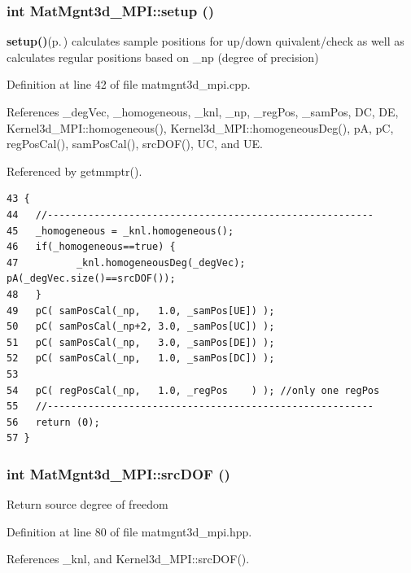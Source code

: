 \subsubsection{\setlength{\rightskip}{0pt plus 5cm}int Mat\-Mgnt3d\_\-MPI::setup ()}\label{classMatMgnt3d__MPI_415266b005d267e801176f27c0434a50_415266b005d267e801176f27c0434a50}


{\bf setup()}{\rm (p.\,\pageref{classMatMgnt3d__MPI_415266b005d267e801176f27c0434a50_415266b005d267e801176f27c0434a50})} calculates sample positions for up/down quivalent/check as well as calculates regular positions based on \_\-np (degree of precision) 

Definition at line 42 of file matmgnt3d\_\-mpi.cpp.

References \_\-deg\-Vec, \_\-homogeneous, \_\-knl, \_\-np, \_\-reg\-Pos, \_\-sam\-Pos, DC, DE, Kernel3d\_\-MPI::homogeneous(), Kernel3d\_\-MPI::homogeneous\-Deg(), p\-A, p\-C, reg\-Pos\-Cal(), sam\-Pos\-Cal(), src\-DOF(), UC, and UE.

Referenced by getmmptr().

\footnotesize\begin{verbatim}43 {
44   //--------------------------------------------------------
45   _homogeneous = _knl.homogeneous();
46   if(_homogeneous==true) {
47          _knl.homogeneousDeg(_degVec); pA(_degVec.size()==srcDOF());
48   }
49   pC( samPosCal(_np,   1.0, _samPos[UE]) );
50   pC( samPosCal(_np+2, 3.0, _samPos[UC]) );
51   pC( samPosCal(_np,   3.0, _samPos[DE]) );
52   pC( samPosCal(_np,   1.0, _samPos[DC]) );
53   
54   pC( regPosCal(_np,   1.0, _regPos    ) ); //only one regPos
55   //--------------------------------------------------------
56   return (0);
57 }
\end{verbatim}\normalsize 


\subsubsection{\setlength{\rightskip}{0pt plus 5cm}int Mat\-Mgnt3d\_\-MPI::src\-DOF ()\hspace{0.3cm}{\tt  [inline]}}\label{classMatMgnt3d__MPI_6b422ba557bb24eff82ac7125e206568_6b422ba557bb24eff82ac7125e206568}


Return source degree of freedom 

Definition at line 80 of file matmgnt3d\_\-mpi.hpp.

References \_\-knl, and Kernel3d\_\-MPI::src\-DOF().

